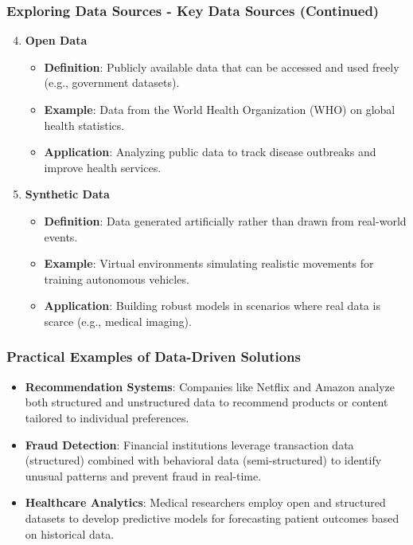 \documentclass[aspectratio=169]{beamer}
\begin{document}
\begin{frame}[fragile]
    \frametitle{Exploring Data Sources - Key Data Sources (Continued)}
    
    \begin{enumerate}
        \setcounter{enumi}{3} %
        \item \textbf{Open Data}
        \begin{itemize}
            \item \textbf{Definition}: Publicly available data that can be accessed and used freely (e.g., government datasets).
            \item \textbf{Example}: Data from the World Health Organization (WHO) on global health statistics.
            \item \textbf{Application}: Analyzing public data to track disease outbreaks and improve health services.
        \end{itemize}
        
        \item \textbf{Synthetic Data}
        \begin{itemize}
            \item \textbf{Definition}: Data generated artificially rather than drawn from real-world events.
            \item \textbf{Example}: Virtual environments simulating realistic movements for training autonomous vehicles.
            \item \textbf{Application}: Building robust models in scenarios where real data is scarce (e.g., medical imaging).
        \end{itemize}
    \end{enumerate}
\end{frame}

\begin{frame}[fragile]
    \frametitle{Practical Examples of Data-Driven Solutions}
    
    \begin{itemize}
        \item \textbf{Recommendation Systems}: Companies like Netflix and Amazon analyze both structured and unstructured data to recommend products or content tailored to individual preferences.
        \item \textbf{Fraud Detection}: Financial institutions leverage transaction data (structured) combined with behavioral data (semi-structured) to identify unusual patterns and prevent fraud in real-time.
        \item \textbf{Healthcare Analytics}: Medical researchers employ open and structured datasets to develop predictive models for forecasting patient outcomes based on historical data.
    \end{itemize}
\end{frame}
\end{document}
